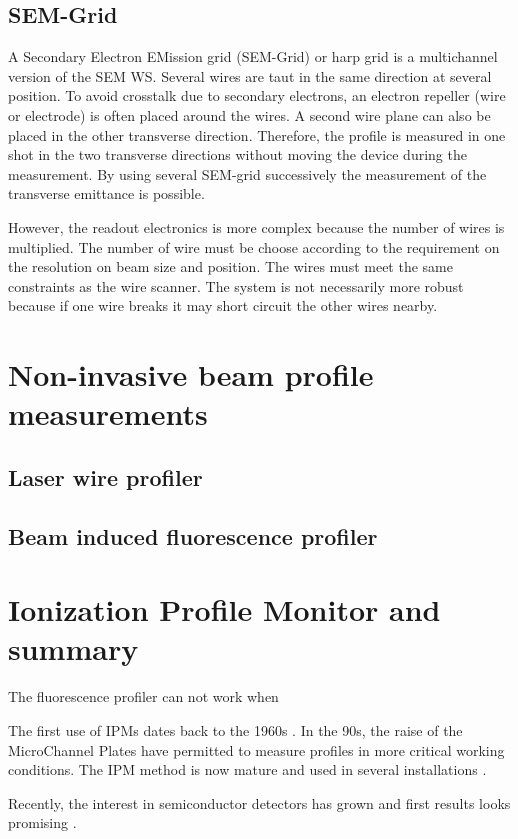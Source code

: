 \begin{refsection}
  \subsection{SEM-Grid}
  A Secondary Electron EMission grid (SEM-Grid) or harp grid is a multichannel version of the SEM WS. Several wires are taut in the same direction at several position. To avoid crosstalk due to secondary electrons, an electron repeller (wire or electrode) is often placed around the wires. A second wire plane can also be placed in the other transverse direction. Therefore, the profile is measured in one shot in the two transverse directions without moving the device during the measurement. By using several SEM-grid successively the measurement of the transverse emittance is possible.

  However, the readout electronics is more complex because the number of wires is multiplied. The number of wire must be choose according to the requirement on the resolution on beam size and position. The wires must meet the same constraints as the wire scanner. The system is not necessarily more robust because if one wire breaks it may short circuit the other wires nearby.

  \section{Non-invasive beam profile measurements}
  \subsection{Laser wire profiler}
  \subsection{Beam induced fluorescence profiler}
  \section{Ionization Profile Monitor and summary}
  The fluorescence profiler can not work when

  The first use of IPMs dates back to the 1960s \cite{DeLuc1969}.
  In the 90s, the raise of the MicroChannel Plates have permitted to measure profiles \cite{Krider1989,Wittenburg1992} in more critical working conditions.
  The IPM method is now mature and used in several installations \cite{Satou2006,Giacomini2011,Morris2011,egberts2012}.

  Recently, the interest in semiconductor detectors has grown \cite{Storey2015} and first results looks promising \cite{Storey2017}.


\end{refsection}
